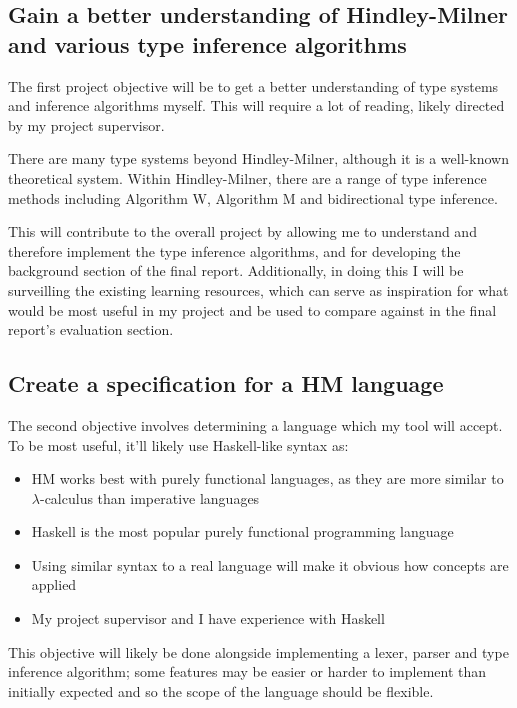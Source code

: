 \documentclass[12pt]{article}
\begin{document}
\subsection{Gain a better understanding of Hindley-Milner and various type inference algorithms}

The first project objective will be to get a better understanding of type systems and inference algorithms myself. This will require a lot of reading, likely directed by my project supervisor.

There are many type systems beyond Hindley-Milner, although it is a well-known theoretical system. Within Hindley-Milner, there are a range of type inference methods including Algorithm W\cite{ref4}, Algorithm M\cite{ref5} and bidirectional\cite{ref6} type inference.

This will contribute to the overall project by allowing me to understand and therefore implement the type inference algorithms, and for developing the background section of the final report. Additionally, in doing this I will be surveilling the existing learning resources, which can serve as inspiration for what would be most useful in my project and be used to compare against in the final report’s evaluation section.

\subsection{Create a specification for a HM language}

The second objective involves determining a language which my tool will accept. To be most useful, it’ll likely use Haskell-like syntax as:

\begin{itemize}
  \item HM works best with purely functional languages, as they are more similar to $\lambda$-calculus than imperative languages
  \item Haskell is the most popular purely functional programming language\cite{ref7}
  \item Using similar syntax to a real language will make it obvious how concepts are applied
  \item My project supervisor and I have experience with Haskell
\end{itemize}

This objective will likely be done alongside implementing a lexer, parser and type inference algorithm; some features may be easier or harder to implement than initially expected and so the scope of the language should be flexible.
\end{document}
